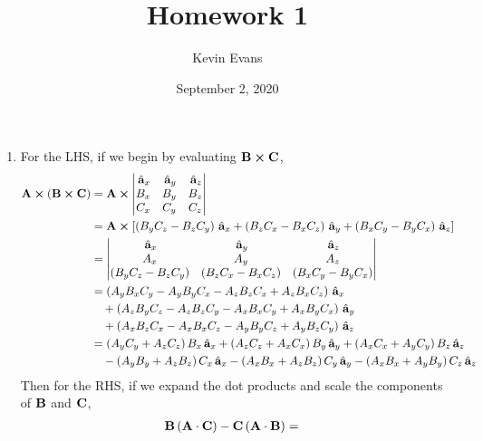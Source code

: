 \documentclass{homework}
\title{Homework 1}
\author{Kevin Evans}
\date{September 2, 2020}
\begin{document}
	\maketitle

	\begin{enumerate}
		\item For the LHS, if we begin by evaluating $\boldsymbol{\mathrm{B}} \cross \boldsymbol{\mathrm{C}}$, \begin{align*}
			\boldsymbol{\mathrm{A}} \cross \left(\boldsymbol{\mathrm{B}} \cross \boldsymbol{\mathrm{C}} \right) & = \boldsymbol{\mathrm{A}} \cross \abs{
					\begin{matrix}
						\thinspace\hat{ \mathbf{a}}_{x} & \thinspace\hat{ \mathbf{a}}_{y} & \thinspace\hat{ \mathbf{a}}_{z} \\
						B_x & B_y & B_z \\
						C_x & C_y & C_z
					\end{matrix}
				} \\
				& = \boldsymbol{\mathrm{A}} \cross \left[
					\left(B_y C_z - B_z C_y\right) \thinspace\hat{ \mathbf{a}}_{x}
					+ \left( B_z C_x - B_x C_z \right) \thinspace\hat{ \mathbf{a}}_{y} 
					+ \left( B_x C_y - B_y C_x \right) \thinspace\hat{ \mathbf{a}}_{z}
				\right] \\
				& = \abs{
					\begin{matrix}
						\thinspace\hat{ \mathbf{a}}_{x} & \thinspace\hat{ \mathbf{a}}_{y} & \thinspace\hat{ \mathbf{a}}_{z} \\
						A_x & A_y & A_z \\
						\left(B_y C_z - B_z C_y\right)
						& \left( B_z C_x - B_x C_z \right)
						& \left( B_x C_y - B_y C_x \right)
					\end{matrix}
				} \\
				& = \left(A_y B_x C_y - A_y B_y C_x - A_z B_z C_x + A_z B_x C_z\right) \thinspace\hat{ \mathbf{a}}_{x} \\
				& \quad + \left( A_z B_y C_z - A_z B_z C_y - A_x B_x C_y + A_x B_y C_x \right) \thinspace\hat{ \mathbf{a}}_{y} \\
				& \quad + \left( A_x B_z C_x - A_x B_x C_z - A_y B_y C_z + A_y B_z C_y \right) \thinspace\hat{ \mathbf{a}}_{z} \\
				& = \left( A_y C_y + A_z C_z  \right) B_x \thinspace\hat{ \mathbf{a}}_{x}
					+ \left( A_z C_z + A_x C_x \right) B_y \thinspace\hat{ \mathbf{a}}_{y}
					+ \left( A_x C_x + A_y C_y \right) B_z \thinspace\hat{ \mathbf{a}}_{z} \\
				& \quad - \left(A_y B_y + A_z B_z\right) C_x \thinspace\hat{ \mathbf{a}}_{x}
					- \left( A_x B_x + A_z B_z\right) C_y \thinspace\hat{ \mathbf{a}}_{y}
					- \left( A_x B_x + A_y B_y \right) C_z \thinspace\hat{ \mathbf{a}}_{z}
		\end{align*}
		Then for the RHS, if we expand the dot products and scale the components of $\boldsymbol{\mathrm{B}}$ and $\boldsymbol{\mathrm{C}}$, \begin{align*}
			\bvec{B} \left(\bvec{A} \cdot \bvec{C}\right) - \bvec{C} \left(\bvec{A} \cdot \bvec{B}\right) & =

\end{align*}
\end{enumerate}
\end{document}
